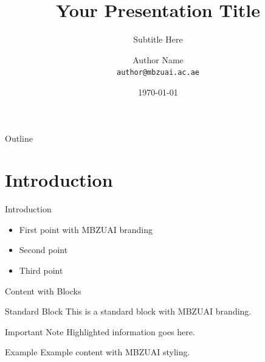 \documentclass[aspectratio=169, 11pt]{beamer}
\title[MBZUAI]{Your Presentation Title}
\subtitle{Subtitle Here}
\author[Author Name]{Author Name \\ \texttt{author@mbzuai.ac.ae}}
\institute[MBZUAI]{Mohamed bin Zayed University of Artificial Intelligence}
\date{\today}
\begin{document}
{
\begin{frame}[t]
\titlepage
\end{frame}
}

{
\begin{frame}{Outline}
    \vspace{2mm}
    \tableofcontents
\end{frame}
}

\section{Introduction}

\begin{frame}{Introduction}
    \begin{itemize}
        \item First point with MBZUAI branding
        \item Second point
        \item Third point
    \end{itemize}
\end{frame}

\begin{frame}{Content with Blocks}
    \begin{block}{Standard Block}
        This is a standard block with MBZUAI branding.
    \end{block}

    \begin{alertblock}{Important Note}
        Highlighted information goes here.
    \end{alertblock}

    \begin{exampleblock}{Example}
        Example content with MBZUAI styling.
    \end{exampleblock}
\end{frame}

\end{document}
